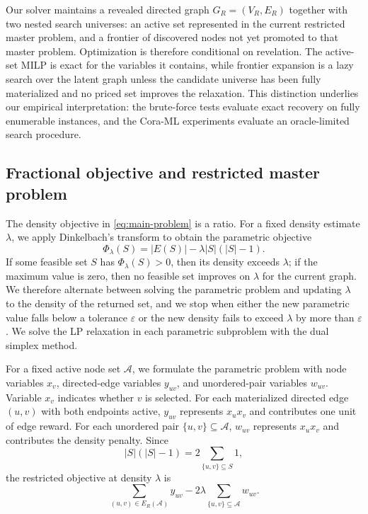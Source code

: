 \documentclass[12pt]{article}
\newcommand{\A}{\mathcal{A}}
\begin{document}
Our solver maintains a revealed directed graph $G_R=(V_R,E_R)$ together with two nested search universes: an active set represented in the current restricted master problem, and a frontier of discovered nodes not yet promoted to that master problem.  Optimization is therefore conditional on revelation.  The active-set MILP is exact for the variables it contains, while frontier expansion is a lazy search over the latent graph unless the candidate universe has been fully materialized and no priced set improves the relaxation.  This distinction underlies our empirical interpretation: the brute-force tests evaluate exact recovery on fully enumerable instances, and the Cora-ML experiments evaluate an oracle-limited search procedure.

\subsection{Fractional objective and restricted master problem}
\label{subsec:rmp}

The density objective in \eqref{eq:main-problem} is a ratio.  For a fixed density estimate $\lambda$, we apply Dinkelbach's transform to obtain the parametric objective
\begin{equation}
  \label{eq:parametric-objective}
  \Phi_\lambda(S)=|E(S)|-\lambda |S|(|S|-1).
\end{equation}
If some feasible set $S$ has $\Phi_\lambda(S)>0$, then its density exceeds $\lambda$; if the maximum value is zero, then no feasible set improves on $\lambda$ for the current graph.  We therefore alternate between solving the parametric problem and updating $\lambda$ to the density of the returned set, and we stop when either the new parametric value falls below a tolerance $\varepsilon$ or the new density fails to exceed $\lambda$ by more than $\varepsilon$.  We solve the LP relaxation in each parametric subproblem with the dual simplex method.

For a fixed active node set $\A$, we formulate the parametric problem with node variables $x_v$, directed-edge variables $y_{uv}$, and unordered-pair variables $w_{uv}$.  Variable $x_v$ indicates whether $v$ is selected.  For each materialized directed edge $(u,v)$ with both endpoints active, $y_{uv}$ represents $x_u x_v$ and contributes one unit of edge reward.  For each unordered pair $\{u,v\}\subseteq\A$, $w_{uv}$ represents $x_u x_v$ and contributes the density penalty.  Since
\[
  |S|(|S|-1)=2\sum_{\{u,v\}\subseteq S}1,
\]
the restricted objective at density $\lambda$ is
\begin{equation}
  \label{eq:rmp-objective}
  \sum_{(u,v)\in E_R(\A)} y_{uv}
  -2\lambda\sum_{\{u,v\}\subseteq\A} w_{uv}.
\end{equation}
\end{document}
